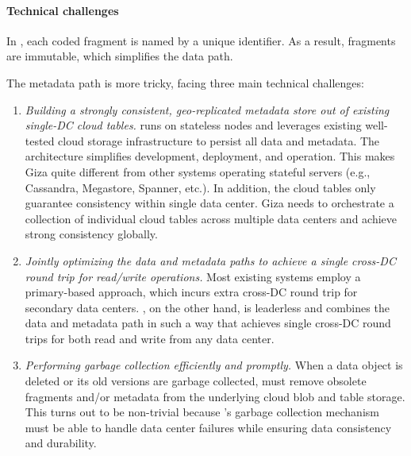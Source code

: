 \paragraph{Technical challenges}
In \name, each coded fragment is named by a unique identifier.
As a result, fragments are immutable, which simplifies the data path.

The metadata path is more tricky, facing three main technical challenges:
\begin{enumerate}

\item {\it Building a strongly consistent, 
geo-replicated metadata store out of existing single-DC cloud tables.}
\name runs on stateless nodes and leverages existing well-tested
cloud storage infrastructure to persist all data and metadata.
The architecture simplifies development, deployment, and operation.
This makes Giza quite different from other systems
operating stateful servers (e.g., Cassandra, Megastore, Spanner, etc.).
In addition, the cloud tables only guarantee consistency within single data center.
Giza needs to orchestrate a collection of individual cloud tables across multiple data centers
and achieve strong consistency globally.

\item {\it Jointly optimizing the data and metadata paths to achieve a single
  cross-DC round trip for read/write operations.}
Most existing systems employ a primary-based approach,
which incurs extra cross-DC round trip for secondary data centers.
\name, on the other hand, is leaderless and
combines the data and metadata path in such a way that achieves
	single cross-DC round trips for both read and write from any data center.

\item {\it Performing garbage collection efficiently and promptly.} When a data
  object is deleted or its old versions are garbage collected, \name must
  remove obsolete fragments and/or metadata from the underlying cloud blob
	and table storage.
	This turns out to be non-trivial because \name's
  garbage collection mechanism must be able to handle data center failures while
  ensuring data consistency and durability.

\end{enumerate}

